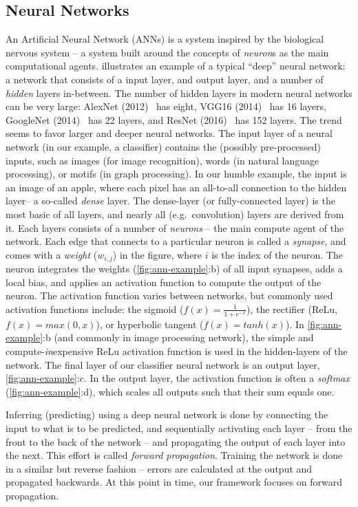 \documentclass[techrep,english]{ipsj} %
\begin{document}
{\subsection{Neural Networks}
An Artificial Neural Network (ANNs) is a system inspired by the biological nervous system -- a system built around the concepts of \textit{neuron}s as the main computational agents.
 illustrates an example of a typical “deep” neural network: a network that consists of a input layer, and output layer, and a number of \textit{hidden} layers in-between.
The number of hidden layers in modern neural networks can be very large: AlexNet (2012)~\cite{krizhevsky2012imagenet} has eight, VGG16 (2014)~\cite{simonyan2014very} has 16 layers, GoogleNet (2014)~\cite{szegedy2015going} has 22 layers, and ResNet (2016)~\cite{he2016deep} has 152 layers.
The trend seems to favor larger and deeper neural networks.
The input layer of a neural network (in our example, a classifier) contains the (possibly pre-processed) inputs, such as images (for image recognition), words (in natural language processing), or motifs (in graph processing).
In our humble example, the input is an image of an apple, where each pixel has an all-to-all connection to the hidden layer-- a so-called \textit{dense} layer. The dense-layer (or fully-connected layer) is the most basic of all layers, and nearly all (e.g.\ convolution) layers are derived from it.
Each layers consists of a number of \textit{neurons} – the main compute agent of the network.
Each edge that connects to a particular neuron is called a \textit{synapse}, and comes with a \textit{weight} (\(w_{i,j}\)) in the figure, where \(i\) is the index of the neuron.
The neuron integrates the weights (\cref{fig:ann-example}:b) of all input synapses, adds a local bias, and applies an activation function to compute the output of the neuron. The activation function varies between networks, but commonly used activation functions include: the sigmoid (\(f(x) = \frac{1}{1+e^{-x}}\)), the rectifier (ReLu, \(f(x) = max(0,x)\)), or hyperbolic tangent (\(f(x) = tanh(x)\)).
In \cref{fig:ann-example}:b (and commonly in image processing network), the simple and compute-\textit{in}expensive ReLu activation function is used in the hidden-layers of the network. The final layer of our classifier neural network is an output layer, \cref{fig:ann-example}:c. In the output layer, the activation function is often a \textit{softmax} (\cref{fig:ann-example}:d), which scales all outputs such that their sum equals one.

Inferring (predicting) using a deep neural network is done by connecting the input to what is to be predicted, and sequentially activating each layer -- from the front to the back of the network -- and propagating the output of each layer into the next.
This effort is called \textit{forward propagation}. Training the network is done in a similar but reverse fashion -- errors are calculated at the output and propagated backwards.
At this point in time, our framework focuses on forward propagation.

}
\end{document}
